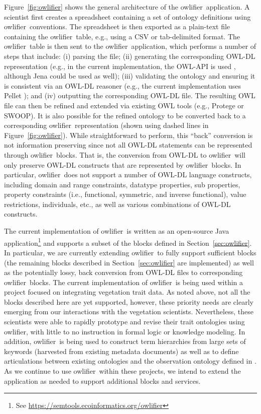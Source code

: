 \documentclass[5p,authoryear]{elsarticle}
\newcommand{\owlifier}{\textsf{owlifier}}
\newcommand{\secref}[1]{Section~\ref{#1}}
\newcommand{\figref}[1]{Figure~\ref{#1}}
\begin{document}
\figref{fig:owlifier} shows the general architecture of the
\owlifier\ application. A scientist first creates a spreadsheet
containing a set of ontology definitions using \owlifier\ conventions.
The spreadsheet is then exported as a plain-text file containing the
\owlifier\ table, e.g., using a CSV or tab-delimited format. The
\owlifier\ table is then sent to the \owlifier\ application, which
performs a number of steps that include: (i) parsing the file; (ii)
generating the corresponding OWL-DL representation (e.g., in the
current implementation, the OWL-API is used
\citep{horridge07:_ignit_owl}, although Jena \citep{carroll04:_jena}
could be used as well); (iii) validating the ontology and ensuring it
is consistent via an OWL-DL reasoner (e.g., the current implementation
uses Pellet \citep{sirin07:_pellet}); and (iv) outputting the
corresponding OWL-DL file. The resulting OWL file can then be refined
and extended via existing OWL tools (e.g., Protege or SWOOP). It is
also possible for the refined ontology to be converted back to a
corresponding \owlifier\ representation (shown using dashed lines in
\figref{fig:owlifier}). While straightforward to perform, this
``back'' conversion is not information preserving since not all OWL-DL
statements can be represented through \owlifier\ blocks.  That is, the
conversion from OWL-DL to \owlifier\ will only preserve OWL-DL
constructs that are represented by \owlifier\ blocks.  In particular,
\owlifier\ does not support a number of OWL-DL language constructs,
including domain and range constraints, datatype properties, sub
properties, property constraints (i.e., functional, symmetric, and
inverse functional), value restrictions, individuals, etc., as well as
various combinations of OWL-DL constructs.

The current implementation of \owlifier\ is written as an open-source
Java application\footnote{See
  \url{https://semtools.ecoinformatics.org/owlifier}} and supports a
subset of the blocks defined in \secref{sec:owlifier}. In particular,
we are currently extending \owlifier\ to fully support sufficient
blocks (the remaining blocks described in \secref{sec:owlifier} are
implemented) as well as the potentially lossy, back conversion from
OWL-DL files to corresponding \owlifier\ blocks. The current
implementation of \owlifier\ is being used within a project focused on
integrating vegetation trait data.  As noted above, not all the blocks
described here are yet supported, however, these priority needs are
clearly emerging from our interactions with the vegetation scientists.
Nevertheless, these scientists were able to rapidly prototype and
revise their trait ontologies using \owlifier, with little to no
instruction in formal logic or knowledge modeling.  In addition,
\owlifier\ is being used to construct term hierarchies from large sets
of keywords (harvested from existing metadata documents) as well as to
define articulations between existing ontologies and the observation
ontology defined in \citep{madin07:_ontol_for_descr_and_synth}. As we
continue to use \owlifier\ within these projects, we intend to extend
the application as needed to support additional blocks and services.
\end{document}
